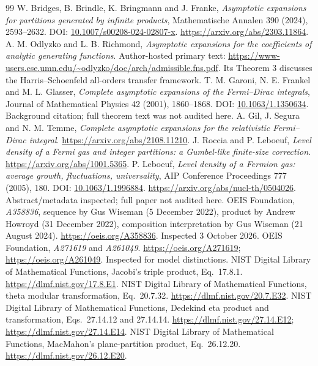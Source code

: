 \documentclass[11pt]{article}
\theoremstyle{remark}\newtheorem{remark}[theorem]{Remark}
\begin{document}
\begin{thebibliography}{99}
 W. Bridges, B. Brindle, K. Bringmann and J. Franke, \emph{Asymptotic expansions for partitions generated by infinite products}, Mathematische Annalen 390 (2024), 2593--2632. DOI: \href{https://doi.org/10.1007/s00208-024-02807-x}{10.1007/s00208-024-02807-x}. \url{https://arxiv.org/abs/2303.11864}.
 A. M. Odlyzko and L. B. Richmond, \emph{Asymptotic expansions for the coefficients of analytic generating functions}. Author-hosted primary text: \url{https://www-users.cse.umn.edu/~odlyzko/doc/arch/admissible.fns.pdf}. Its Theorem 3 discusses the Harris--Schoenfeld all-orders transfer framework.
 T. M. Garoni, N. E. Frankel and M. L. Glasser, \emph{Complete asymptotic expansions of the Fermi--Dirac integrals}, Journal of Mathematical Physics 42 (2001), 1860--1868. DOI: \href{https://doi.org/10.1063/1.1350634}{10.1063/1.1350634}. Background citation; full theorem text was not audited here.
 A. Gil, J. Segura and N. M. Temme, \emph{Complete asymptotic expansions for the relativistic Fermi--Dirac integral}. \url{https://arxiv.org/abs/2108.11210}.
 J. Roccia and P. Leboeuf, \emph{Level density of a Fermi gas and integer partitions: a Gumbel-like finite-size correction}. \url{https://arxiv.org/abs/1001.5365}.
 P. Leboeuf, \emph{Level density of a Fermion gas: average growth, fluctuations, universality}, AIP Conference Proceedings 777 (2005), 180. DOI: \href{https://doi.org/10.1063/1.1996884}{10.1063/1.1996884}. \url{https://arxiv.org/abs/nucl-th/0504026}. Abstract/metadata inspected; full paper not audited here.
 OEIS Foundation, \emph{A358836}, sequence by Gus Wiseman (5 December 2022), product by Andrew Howroyd (31 December 2022), composition interpretation by Gus Wiseman (21 August 2024). \url{https://oeis.org/A358836}. Inspected 3 October 2026.
 OEIS Foundation, \emph{A271619} and \emph{A261049}. \url{https://oeis.org/A271619}; \url{https://oeis.org/A261049}. Inspected for model distinctions.
 NIST Digital Library of Mathematical Functions, Jacobi's triple product, Eq.~17.8.1. \url{https://dlmf.nist.gov/17.8.E1}.
 NIST Digital Library of Mathematical Functions, theta modular transformation, Eq.~20.7.32. \url{https://dlmf.nist.gov/20.7.E32}.
 NIST Digital Library of Mathematical Functions, Dedekind eta product and transformation, Eqs.~27.14.12 and 27.14.14. \url{https://dlmf.nist.gov/27.14.E12}; \url{https://dlmf.nist.gov/27.14.E14}.
 NIST Digital Library of Mathematical Functions, MacMahon's plane-partition product, Eq.~26.12.20. \url{https://dlmf.nist.gov/26.12.E20}.

\end{thebibliography}
\end{document}
